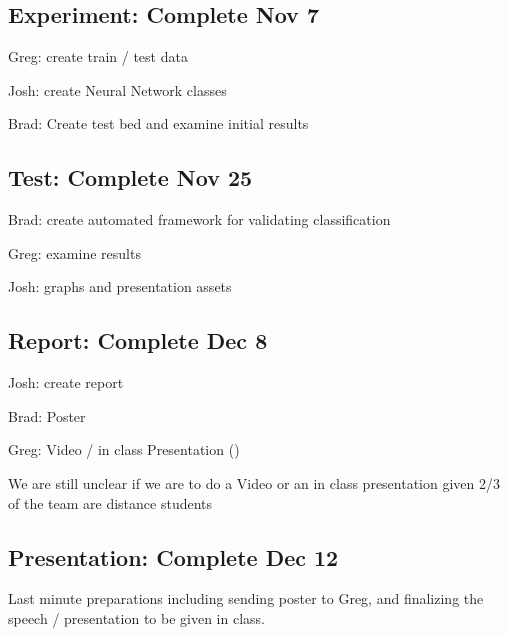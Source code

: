 \documentclass{article}
\begin{document}
\subsection{Experiment: Complete Nov 7}
Greg: create train / test data

Josh: create Neural Network classes

Brad: Create test bed and examine initial results

\subsection{Test: Complete Nov 25}
Brad: create automated framework for validating classification

Greg: examine results

Josh: graphs and presentation assets

\subsection{Report: Complete Dec 8}
Josh: create report

Brad: Poster

Greg: Video / in class Presentation ()

We are still unclear if we are to do a Video or an in class presentation given 2/3 of the team are distance students

\subsection{Presentation: Complete Dec 12}

Last minute preparations including sending poster to Greg, and finalizing the speech / presentation to be given in class.

\nocite{*}


\end{document}
